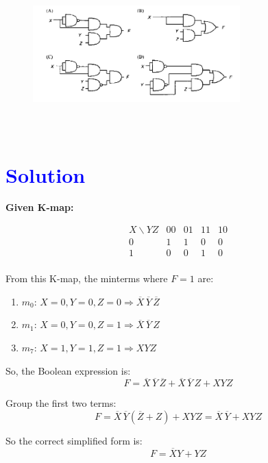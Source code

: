 \documentclass[a4paper,12pt]{article}
\begin{document}
\vspace{1em}
\begin{figure}[!h]
 \centering
     \includegraphics[width=8cm,height=6cm]{img2.png}
     \caption{}

 \end{figure}
 \section*{\textcolor{blue}{Solution}}
 
\textbf{Given K-map:}

\[
\begin{array}{c|cccc}
X \backslash YZ & 00 & 01 & 11 & 10 \\
\hline
0 & 1 & 1 & 0 & 0 \\
1 & 0 & 0 & 1 & 0 \\
\end{array}
\]

From this K-map, the minterms where \( F = 1 \) are:

\begin{enumerate}
    \item \( m_0 \): \( X = 0, Y = 0, Z = 0 \Rightarrow \overline{X} \, \overline{Y} \, \overline{Z} \)
    \item \( m_1 \): \( X = 0, Y = 0, Z = 1 \Rightarrow \overline{X} \, \overline{Y} \, Z \)
    \item \( m_7 \): \( X = 1, Y = 1, Z = 1 \Rightarrow X Y Z \)
\end{enumerate}

So, the Boolean expression is:
\[
F = \overline{X} \, \overline{Y} \, \overline{Z} + \overline{X} \, \overline{Y} \, Z + X Y Z
\]

Group the first two terms:
\[
F = \overline{X} \, \overline{Y} (\overline{Z} + Z) + X Y Z = \overline{X} \, \overline{Y} + X Y Z
\]

So the correct simplified form is:
\[
\boxed{F = \overline{X} Y + Y Z}
\]
\end{document}
